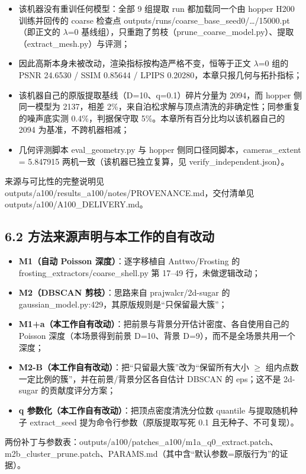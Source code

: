 \documentclass[UTF8,a4paper,11pt]{ctexart}
\begin{document}
\begin{itemize}
\setlength{\itemsep}{2pt}
  \item 该机器没有重训任何模型：全部 9 组提取 run 都加载同一个由 hopper H200 训练并回传的 coarse 检查点 outputs/runs/coarse\_base\_seed0/\ldots{}/15000.pt（即正文的 $\lambda$=0 基线组），只重跑了剪枝（prune\_coarse\_model.py）、提取（extract\_mesh.py）与评测；
  \item 因此高斯本身未被改动，渲染指标按构造严格不变，恒等于正文 $\lambda$=0 组的 PSNR 24.6530 / SSIM 0.85644 / LPIPS 0.20280，本章只报几何与拓扑指标；
  \item 该机器自己的原版提取基线（D=10、q=0.1）碎片分量为 2094，而 hopper 侧同一模型为 2137，相差 2\%，来自泊松求解与顶点清洗的非确定性；同参重复的噪声底实测 0.4\%，判据保守取 5\%。本章所有百分比均以该机器自己的 2094 为基准，不跨机器相减；
  \item 几何评测脚本 eval\_geometry.py 与 hopper 侧同口径同脚本，cameras\_extent = 5.847915 两机一致（该机器已独立复算，见 verify\_independent.json）。
\end{itemize}
来源与可比性的完整说明见 outputs/a100/results\_a100/notes/PROVENANCE.md，交付清单见 outputs/a100/A100\_DELIVERY.md。

\subsection{6.2 方法来源声明与本工作的自有改动}
\begin{itemize}
\setlength{\itemsep}{2pt}
  \item \textbf{M1（自动 Poisson 深度）}：逐字移植自 Anttwo/Frosting 的 frosting\_extractors/coarse\_shell.py 第 17--49 行，未做逻辑改动；
  \item \textbf{M2（DBSCAN 剪枝）}：思路来自 prajwalcr/2d-sugar 的 gaussian\_model.py:429，其原版规则是“只保留最大簇”；
  \item \textbf{M1+a（本工作自有改动）}：把前景与背景分开估计密度、各自使用自己的 Poisson 深度（本场景得到前景 D=10、背景 D=9），而不是全场景共用一个深度；
  \item \textbf{M2-B（本工作自有改动）}：把“只留最大簇”改为“保留所有大小 $\ge$ 组内点数一定比例的簇”，并在前景/背景分区各自估计 DBSCAN 的 eps；这不是 2d-sugar 的贡献度评分方案；
  \item \textbf{q 参数化（本工作自有改动）}：把顶点密度清洗分位数 quantile 与提取随机种子 extract\_seed 提为命令行参数（原版提取写死 0.1 且无种子、不可复现）。
\end{itemize}
两份补丁与参数表：outputs/a100/patches\_a100/m1a\_q0\_extract.patch、m2b\_cluster\_prune.patch、PARAMS.md（其中含“默认参数=原版行为”的证据）。
\end{document}
